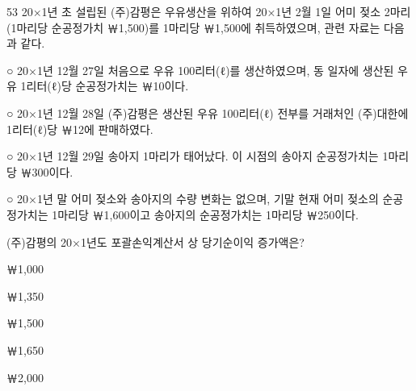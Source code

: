 \begin{question}{53}
20×1년 초 설립된 (주)감평은 우유생산을 위하여 20×1년 2월 1일 어미 젖소 2마리(1마리당 순공정가치 ￦1,500)를 1마리당 ￦1,500에 취득하였으며, 관련 자료는 다음과 같다.
\begin{framedtext}
○ 20×1년 12월 27일 처음으로 우유 100리터(ℓ)를 생산하였으며, 동 일자에 생산된 우유 1리터(ℓ)당 순공정가치는 ￦10이다. \par
○ 20×1년 12월 28일 (주)감평은 생산된 우유 100리터(ℓ) 전부를 거래처인 (주)대한에 1리터(ℓ)당 ￦12에 판매하였다. \par
○ 20×1년 12월 29일 송아지 1마리가 태어났다. 이 시점의 송아지 순공정가치는 1마리당 ￦300이다. \par
○ 20×1년 말 어미 젖소와 송아지의 수량 변화는 없으며, 기말 현재 어미 젖소의 순공정가치는 1마리당 ￦1,600이고 송아지의 순공정가치는 1마리당 ￦250이다.
\end{framedtext}
(주)감평의 20×1년도 포괄손익계산서 상 당기순이익 증가액은?
\begin{choices}
  \item ￦1,000
  \item ￦1,350
  \item ￦1,500
  \item ￦1,650
  \item ￦2,000
\end{choices}
\end{question}
